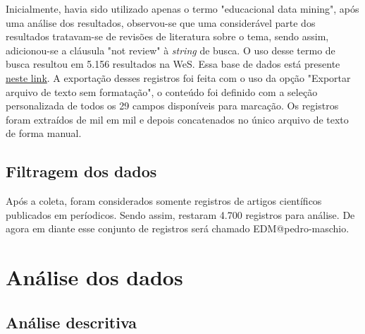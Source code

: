 Inicialmente, havia sido utilizado apenas o termo "educacional data mining", após uma análise dos resultados, observou-se que uma considerável parte dos resultados tratavam-se de revisões de literatura sobre o tema, sendo assim, adicionou-se a cláusula "not review" à \textit{string} de busca.
O uso desse termo de busca resultou em 5.156 resultados na WeS. Essa base de dados está presente \href{https://github.com/jhcf/Comput-Experim-20212/tree/main/experiments/pedro-maschio/PesquisaBibliogr/MineracaoDadosEducacionais/dataset/savedrecs.txt}{neste link}. A exportação desses registros foi feita com o uso da opção "Exportar arquivo de texto sem formatação", o conteúdo foi definido com a seleção personalizada de todos os 29 campos disponíveis para marcação. Os registros foram extraídos de mil em mil e depois concatenados no único arquivo de texto de forma manual.

\subsection{Filtragem dos dados}

Após a coleta, foram considerados somente registros de artigos científicos publicados em períodicos. Sendo assim, restaram 4.700 registros para análise. De agora em diante esse conjunto de registros será chamado EDM@pedro-maschio.

\section{Análise dos dados}

\subsection{Análise descritiva}

